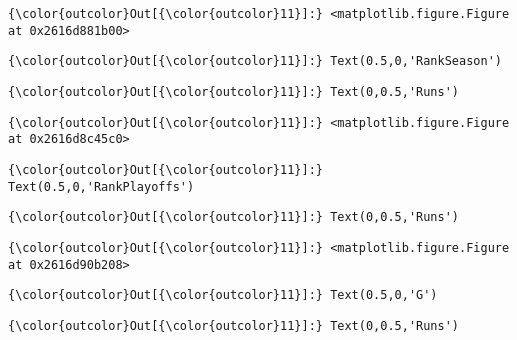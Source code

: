 \documentclass[11pt]{article}
\begin{document}
\begin{Verbatim}[commandchars=\\\{\}]
{\color{outcolor}Out[{\color{outcolor}11}]:} <matplotlib.figure.Figure at 0x2616d881b00>
\end{Verbatim}
            
\begin{Verbatim}[commandchars=\\\{\}]
{\color{outcolor}Out[{\color{outcolor}11}]:} Text(0.5,0,'RankSeason')
\end{Verbatim}
            
\begin{Verbatim}[commandchars=\\\{\}]
{\color{outcolor}Out[{\color{outcolor}11}]:} Text(0,0.5,'Runs')
\end{Verbatim}
            
\begin{Verbatim}[commandchars=\\\{\}]
{\color{outcolor}Out[{\color{outcolor}11}]:} <matplotlib.figure.Figure at 0x2616d8c45c0>
\end{Verbatim}
            
\begin{Verbatim}[commandchars=\\\{\}]
{\color{outcolor}Out[{\color{outcolor}11}]:} Text(0.5,0,'RankPlayoffs')
\end{Verbatim}
            
\begin{Verbatim}[commandchars=\\\{\}]
{\color{outcolor}Out[{\color{outcolor}11}]:} Text(0,0.5,'Runs')
\end{Verbatim}
            
\begin{Verbatim}[commandchars=\\\{\}]
{\color{outcolor}Out[{\color{outcolor}11}]:} <matplotlib.figure.Figure at 0x2616d90b208>
\end{Verbatim}
            
\begin{Verbatim}[commandchars=\\\{\}]
{\color{outcolor}Out[{\color{outcolor}11}]:} Text(0.5,0,'G')
\end{Verbatim}
            
\begin{Verbatim}[commandchars=\\\{\}]
{\color{outcolor}Out[{\color{outcolor}11}]:} Text(0,0.5,'Runs')
\end{Verbatim}
            
\end{document}
